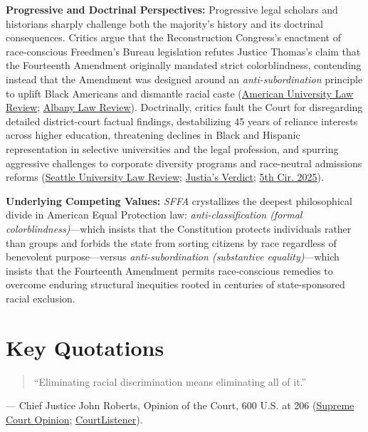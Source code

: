 \documentclass[12pt]{article}
\begin{document}
\textbf{Progressive and Doctrinal Perspectives:} Progressive legal scholars and historians sharply challenge both the majority's history and its doctrinal consequences. Critics argue that the Reconstruction Congress's enactment of race-conscious Freedmen's Bureau legislation refutes Justice Thomas's claim that the Fourteenth Amendment originally mandated strict colorblindness, contending instead that the Amendment was designed around an \textit{anti-subordination} principle to uplift Black Americans and dismantle racial caste (\href{https://aulawreview.org/wp-content/uploads/2023/09/8_HinojosaTorres_Print.pdf}{American University Law Review}; \href{https://www.albanylawreview.org/article/116873-supreme-mirage-clarence-thomas-s-invented-history-of-colorblindness-originalism/attachment/250380.pdf}{Albany Law Review}). Doctrinally, critics fault the Court for disregarding detailed district-court factual findings, destabilizing 45 years of reliance interests across higher education, threatening declines in Black and Hispanic representation in selective universities and the legal profession, and spurring aggressive challenges to corporate diversity programs and race-neutral admissions reforms (\href{https://digitalcommons.law.seattleu.edu/cgi/viewcontent.cgi?article=2876&context=sulr}{Seattle University Law Review}; \href{https://verdict.justia.com/2023/10/11/future-of-affirmative-action-in-employment-decisions}{Justia's Verdict}; \href{https://law.justia.com/cases/federal/appellate-courts/ca5/24-50631/24-50631-2025-07-11.html}{5th Cir. 2025}).

\textbf{Underlying Competing Values:} \textit{SFFA} crystallizes the deepest philosophical divide in American Equal Protection law: \textit{anti-classification (formal colorblindness)}---which insists that the Constitution protects individuals rather than groups and forbids the state from sorting citizens by race regardless of benevolent purpose---versus \textit{anti-subordination (substantive equality)}---which insists that the Fourteenth Amendment permits race-conscious remedies to overcome enduring structural inequities rooted in centuries of state-sponsored racial exclusion.

\section{Key Quotations}

\begin{quote}
``Eliminating racial discrimination means eliminating all of it.''
\end{quote}
\noindent --- Chief Justice John Roberts, Opinion of the Court, 600 U.S. at 206 (\href{https://www.supremecourt.gov/opinions/22pdf/20-1199_hgdj.pdf}{Supreme Court Opinion}; \href{https://www.courtlistener.com/opinion/10049657/students-for-fair-admissions-inc-v-president-and-fellows-of-harvard/}{CourtListener}).
\end{document}
